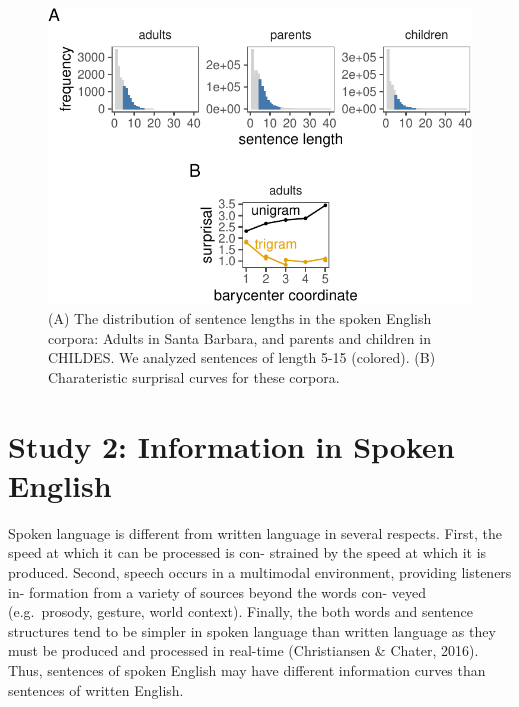 \documentclass[10pt, letterpaper]{article}
\newenvironment{CodeChunk}{}{}
\begin{document}
\begin{CodeChunk}
\begin{figure}[tb]

{\centering \includegraphics{figs/spoken_figs-1} 

}

\caption[(A) The distribution of sentence lengths in the spoken English corpora]{(A) The distribution of sentence lengths in the spoken English corpora: Adults in Santa Barbara, and parents and children in CHILDES. We analyzed sentences of length 5-15 (colored). (B) Charateristic surprisal curves for these corpora.}\label{fig:spoken_figs}
\end{figure}
\end{CodeChunk}

\hypertarget{study-2-information-in-spoken-english}{%
\section{Study 2: Information in Spoken
English}\label{study-2-information-in-spoken-english}}

Spoken language is different from written language in several respects.
First, the speed at which it can be processed is con- strained by the
speed at which it is produced. Second, speech occurs in a multimodal
environment, providing listeners in- formation from a variety of sources
beyond the words con- veyed (e.g.~prosody, gesture, world context).
Finally, the both words and sentence structures tend to be simpler in
spoken language than written language as they must be produced and
processed in real-time (Christiansen \& Chater, 2016). Thus, sentences
of spoken English may have different information curves than sentences
of written English.
\end{document}
